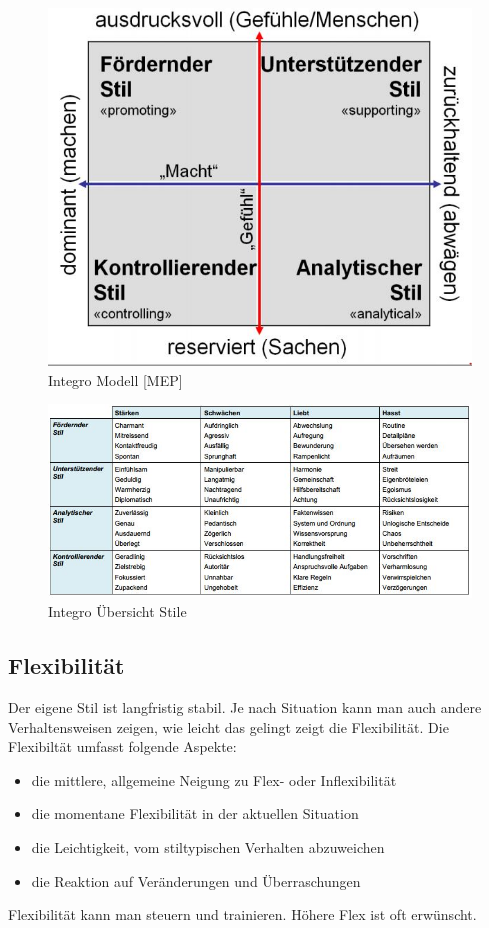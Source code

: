 \begin{figure}[h!]
\centering
\includegraphics[width=0.5\linewidth]{fig/integro-modell}
\caption{Integro Modell [MEP]}
\label{fig:integro-modell}
\end{figure}

\begin{figure}[h!]
\centering
\includegraphics[width=0.7\linewidth]{fig/integro-uebersicht-stile-attribute}
\caption{Integro Übersicht Stile}
\label{fig:integro-uebersicht-stile-attribute}
\end{figure}

\subsection{Flexibilität}
Der eigene Stil ist langfristig stabil. Je nach Situation kann man auch andere Verhaltensweisen zeigen, wie leicht das gelingt zeigt die Flexibilität. Die Flexibiltät umfasst folgende Aspekte:
\begin{itemize}
	 \item die mittlere, allgemeine Neigung zu Flex- oder Inflexibilität
	 \item die momentane Flexibilität in der aktuellen Situation
	 \item die Leichtigkeit, vom stiltypischen Verhalten abzuweichen
	 \item die Reaktion auf Veränderungen und Überraschungen
\end{itemize}
Flexibilität kann man steuern und trainieren. Höhere Flex ist oft erwünscht.